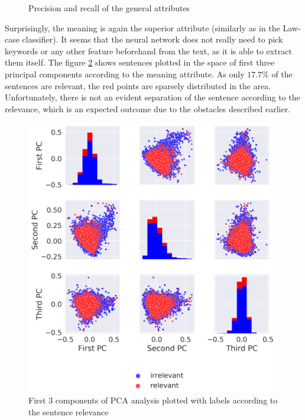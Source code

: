 \documentclass[
  digital, %
  notable,   %
  nolof,     %
  nolot,     %
]{fithesis3}
\begin{document}
\begin{figure}[h]
\begin{subfigure}{.5\textwidth}
\end{subfigure}
\caption{Precision and recall of the general attributes}
\label{fig:sent_PandR}
\end{figure}

Surprisingly, the meaning is again the superior attribute (similarly as in the Law-case classifier).
It seems that the neural network does not really need to pick keywords or any other feature beforehand from the text, as it is able to extract them itself.
The figure \ref{fig:PCA_sent_relevance} shows sentences plotted in the space of first three principal components according to the meaning attribute.
As only $17.7\%$ of the sentences are relevant, the red points are sparsely distributed in the area. Unfortunately, there is not an evident separation of the sentence according to the relevance, which is an expected outcome due to the obstacles described earlier.

\begin{figure}[h]
\caption{First 3 components of PCA analysis plotted with labels according to the sentence relevance}
\label{fig:PCA_sent_relevance}
\includegraphics[width=\textwidth]{img/PCA_sent_relevance}
\end{figure}
\end{document}
